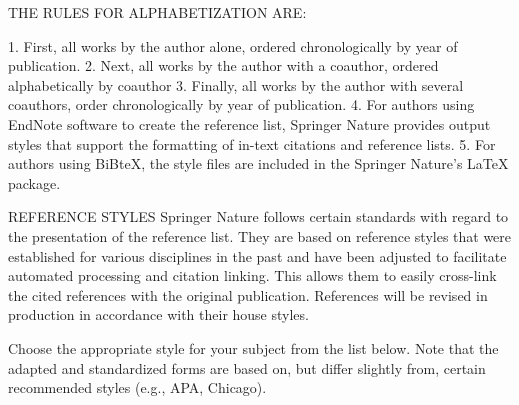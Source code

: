 THE RULES FOR ALPHABETIZATION ARE:

1. First, all works by the author alone, ordered chronologically by year of publication.
2. Next, all works by the author with a coauthor, ordered alphabetically by coauthor
3. Finally, all works by the author with several coauthors, order chronologically by year of publication.
4. For authors using EndNote software to create the reference list, Springer Nature provides output styles that support the formatting of in-text citations and reference lists.
5. For authors using BiBteX, the style files are included in the Springer Nature's LaTeX package.

REFERENCE STYLES
Springer Nature follows certain standards with regard to the presentation of the reference list. They are based on reference styles that were established for various disciplines in the past and have been adjusted to facilitate automated processing and citation linking. This allows them to easily cross-link the cited references with the original publication. References will be revised in production in accordance with their house styles.

Choose the appropriate style for your subject from the list below. Note that the adapted and standardized forms are based on, but differ slightly from, certain recommended styles (e.g., APA, Chicago).















